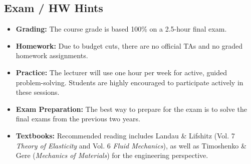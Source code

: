 \begin{center}
\end{center}

\subsection*{Exam / HW Hints}

\begin{itemize}
  \item \textbf{Grading:} The course grade is based 100\% on a 2.5-hour final exam.
  \item \textbf{Homework:} Due to budget cuts, there are no official TAs and no graded homework assignments. 
  \item \textbf{Practice:} The lecturer will use one hour per week for active, guided problem-solving. Students are highly encouraged to participate actively in these sessions.
  \item \textbf{Exam Preparation:} The best way to prepare for the exam is to solve the final exams from the previous two years.
  \item \textbf{Textbooks:} Recommended reading includes Landau \& Lifshitz (Vol. 7 \emph{Theory of Elasticity} and Vol. 6 \emph{Fluid Mechanics}), as well as Timoshenko \& Gere (\emph{Mechanics of Materials}) for the engineering perspective.
\end{itemize}



